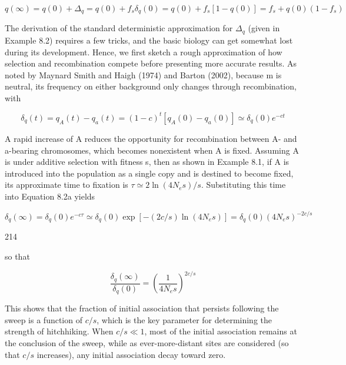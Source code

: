 \documentclass{article}
\begin{document}
\begin{equation}
q(\infty)=q(0)+\Delta_{q}=q(0)+f_{s}\delta_{q}(0)=q(0)+f_{s}[1-q(0)]=f_{s}+q(0)(1-f_{s})
\tag{8.1e}
\label{eq:8_1e}
\end{equation}

The derivation of the standard deterministic approximation for  $ \Delta_{q} $ (given in Example 8.2) requires a few tricks, and the basic biology can get somewhat lost during its development. Hence, we first sketch a rough approximation of how selection and recombination compete before presenting more accurate results. As noted by Maynard Smith and Haigh (1974) and Barton (2002), because m is neutral, its frequency on either background only changes through recombination, with

\begin{equation}
\delta_{q}(t)=q_{A}(t)-q_{a}(t)=(1-c)^{t}\left[q_{A}(0)-q_{a}(0)\right]\simeq\delta_{q}(0)e^{-c t}
\tag{8.2a}
\label{eq:8_2a}
\end{equation}

A rapid increase of A reduces the opportunity for recombination between A- and a-bearing chromosomes, which becomes nonexistent when A is fixed. Assuming A is under additive selection with fitness s, then as shown in Example 8.1, if A is introduced into the population as a single copy and is destined to become fixed, its approximate time to fixation is  $ \tau \simeq 2 \ln(4N_{e}s)/s $. Substituting this time into Equation 8.2a yields

\begin{equation}
\delta_{q}(\infty)=\delta_{q}(0)e^{-c\tau}\simeq\delta_{q}(0)\exp\left[-(2c/s)\ln(4N_{e}s)\right]=\delta_{q}(0)\left(4N_{e}s\right)^{-2c/s}
\tag{8.2b}
\label{eq:8_2b}
\end{equation}

214

so that

\begin{equation}
\frac{\delta_{q}(\infty)}{\delta_{q}(0)}=\left(\frac{1}{4N_{e}s}\right)^{2c/s}
\tag{8.2c}
\label{eq:8_2c}
\end{equation}

This shows that the fraction of initial association that persists following the sweep is a function of  $ c/s $, which is the key parameter for determining the strength of hitchhiking. When  $ c/s \ll 1 $, most of the initial association remains at the conclusion of the sweep, while as ever-more-distant sites are considered (so that  $ c/s $ increases), any initial association decay toward zero.
\end{document}
